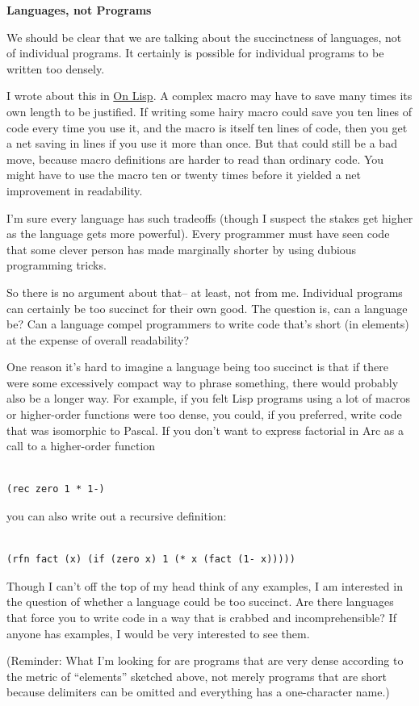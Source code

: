 \textbf{Languages, not Programs}

We should be clear that we are talking about the succinctness of
languages, not of individual programs. It certainly is possible for
individual programs to be written too densely.

I wrote about this in \href{onlisp.html}{On Lisp}. A complex macro may
have to save many times its own length to be justified. If writing some
hairy macro could save you ten lines of code every time you use it, and
the macro is itself ten lines of code, then you get a net saving in
lines if you use it more than once. But that could still be a bad move,
because macro definitions are harder to read than ordinary code. You
might have to use the macro ten or twenty times before it yielded a net
improvement in readability.

I'm sure every language has such tradeoffs (though I suspect the stakes
get higher as the language gets more powerful). Every programmer must
have seen code that some clever person has made marginally shorter by
using dubious programming tricks.

So there is no argument about that-- at least, not from me. Individual
programs can certainly be too succinct for their own good. The question
is, can a language be? Can a language compel programmers to write code
that's short (in elements) at the expense of overall readability?

One reason it's hard to imagine a language being too succinct is that if
there were some excessively compact way to phrase something, there would
probably also be a longer way. For example, if you felt Lisp programs
using a lot of macros or higher-order functions were too dense, you
could, if you preferred, write code that was isomorphic to Pascal. If
you don't want to express factorial in Arc as a call to a higher-order
function

\begin{verbatim}

(rec zero 1 * 1-)
\end{verbatim}

you can also write out a recursive definition:

\begin{verbatim}

(rfn fact (x) (if (zero x) 1 (* x (fact (1- x)))))
\end{verbatim}

Though I can't off the top of my head think of any examples, I am
interested in the question of whether a language could be too succinct.
Are there languages that force you to write code in a way that is
crabbed and incomprehensible? If anyone has examples, I would be very
interested to see them.

(Reminder: What I'm looking for are programs that are very dense
according to the metric of ``elements'' sketched above, not merely
programs that are short because delimiters can be omitted and everything
has a one-character name.)
